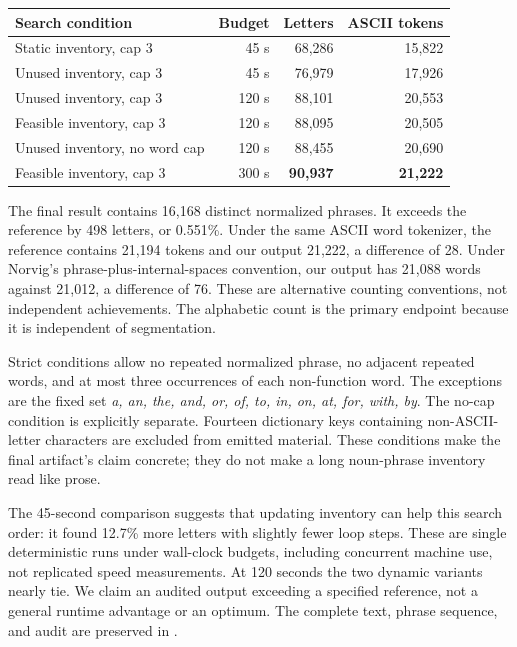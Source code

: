 \documentclass[11pt,letterpaper]{article}
\newcommand{\artifact}[1]{\texttt{\small\detokenize{#1}}}
\newcommand{\pageend}{\clearpage}
\begin{document}
\begin{center}\small
\begin{tabular}{lrrr}\toprule
Search condition & Budget & Letters & ASCII tokens\\\midrule
Static inventory, cap 3 & 45 s & 68,286 & 15,822\\
Unused inventory, cap 3 & 45 s & 76,979 & 17,926\\
Unused inventory, cap 3 & 120 s & 88,101 & 20,553\\
Feasible inventory, cap 3 & 120 s & 88,095 & 20,505\\
Unused inventory, no word cap & 120 s & 88,455 & 20,690\\
Feasible inventory, cap 3 & 300 s & \textbf{90,937} & \textbf{21,222}\\\bottomrule
\end{tabular}
\end{center}

The final result contains 16,168 distinct normalized phrases. It exceeds the reference by 498 letters, or 0.551\%. Under the same ASCII word tokenizer, the reference contains 21,194 tokens and our output 21,222, a difference of 28. Under Norvig's phrase-plus-internal-spaces convention, our output has 21,088 words against 21,012, a difference of 76. These are alternative counting conventions, not independent achievements. The alphabetic count is the primary endpoint because it is independent of segmentation.

Strict conditions allow no repeated normalized phrase, no adjacent repeated words, and at most three occurrences of each non-function word. The exceptions are the fixed set \emph{a, an, the, and, or, of, to, in, on, at, for, with, by}. The no-cap condition is explicitly separate. Fourteen dictionary keys containing non-ASCII-letter characters are excluded from emitted material. These conditions make the final artifact's claim concrete; they do not make a long noun-phrase inventory read like prose.

The 45-second comparison suggests that updating inventory can help this search order: it found 12.7\% more letters with slightly fewer loop steps. These are single deterministic runs under wall-clock budgets, including concurrent machine use, not replicated speed measurements. At 120 seconds the two dynamic variants nearly tie. We claim an audited output exceeding a specified reference, not a general runtime advantage or an optimum. The complete text, phrase sequence, and audit are preserved in \artifact{artifacts/norvig-v3/}.
\pageend
\end{document}
